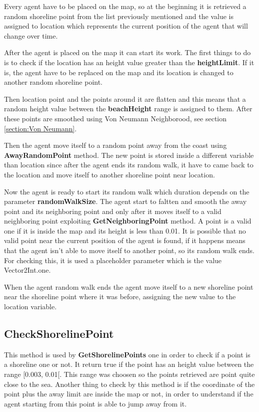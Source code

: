 \documentclass[12pt]{article}
\begin{document}
    Every agent have to be placed on the map, so at the beginning it is retrieved a random shoreline point from the list previously mentioned and the value is assigned to location
    which represents the current position of the agent that will change over time.

    After the agent is placed on the map it can start its work. The first things to do is to check if the location has an height value greater than the \textbf{heightLimit}.
    If it is, the agent have to be replaced on the map and its location is changed to another random shoreline point.
    
    Then location point and the points around it are flatten and this means that a random height value between the \textbf{beachHeight} range is assigned
    to them. After these points are smoothed using Von Neumann Neighborood, see section \ref{section:Von Neumann}.

    Then the agent move itself to a random point away from the coast using \textbf{AwayRandomPoint} method. The new point is stored inside a different variable
    than location since after the agent ends its random walk, it have to came back to the location and move itself to another shoreline point near location.

    Now the agent is ready to start its random walk which duration depends on the parameter \textbf{randomWalkSize}. The agent start to faltten and smooth the away point
    and its neighboring point and only after it moves itself to a valid neighboring point exploiting \textbf{GetNeighboringPoint} method. A point is a valid one if it is 
    inside the map and its height is less than 0.01. It is possible that no valid point near the current position of the agent is found, if it happens means that the 
    agent isn't able to move itself to another point, so its random walk ends. For checking this, it is used a placeholder parameter which is the value Vector2Int.one.

    When the agent random walk ends the agent move itself to a new shoreline point near the shoreline point where it was before, assigning the new value to the 
    location variable.

    \subsection{CheckShorelinePoint}
    This method is used by \textbf{GetShorelinePoints} one in order to check if a point is a shoreline one or not. It return true if the point has an height value
    between the range [0.003, 0.01[. This range was choosen so the points retrieved are point quite close to the sea. Another thing to check by this method is
    if the coordinate of the point plus the away limit are inside the map or not, in order to understand if the agent starting from this point is able to jump away from it.
\end{document}
